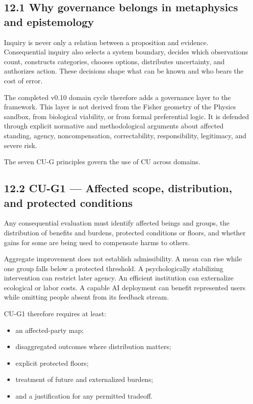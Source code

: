 \documentclass[
  11pt,
]{article}
\providecommand{\tightlist}{%
  \setlength{\itemsep}{0pt}\setlength{\parskip}{0pt}}
\begin{document}
\subsection{12.1 Why governance belongs in metaphysics and
epistemology}\label{why-governance-belongs-in-metaphysics-and-epistemology}

Inquiry is never only a relation between a proposition and evidence.
Consequential inquiry also selects a system boundary, decides which
observations count, constructs categories, chooses options, distributes
uncertainty, and authorizes action. These decisions shape what can be
known and who bears the cost of error.

The completed v0.10 domain cycle therefore adds a governance layer to
the framework. This layer is not derived from the Fisher geometry of the
Physics sandbox, from biological viability, or from formal preferential
logic. It is defended through explicit normative and methodological
arguments about affected standing, agency, noncompensation,
correctability, responsibility, legitimacy, and severe risk.

The seven CU-G principles govern the use of CU across domains.

\subsection{12.2 CU-G1 --- Affected scope, distribution, and protected
conditions}\label{cu-g1-affected-scope-distribution-and-protected-conditions}

Any consequential evaluation must identify affected beings and groups,
the distribution of benefits and burdens, protected conditions or
floors, and whether gains for some are being used to compensate harms to
others.

Aggregate improvement does not establish admissibility. A mean can rise
while one group falls below a protected threshold. A psychologically
stabilizing intervention can restrict later agency. An efficient
institution can externalize ecological or labor costs. A capable AI
deployment can benefit represented users while omitting people absent
from its feedback stream.

CU-G1 therefore requires at least:

\begin{itemize}
\tightlist
\item
  an affected-party map;
\item
  disaggregated outcomes where distribution matters;
\item
  explicit protected floors;
\item
  treatment of future and externalized burdens;
\item
  and a justification for any permitted tradeoff.
\end{itemize}
\end{document}
